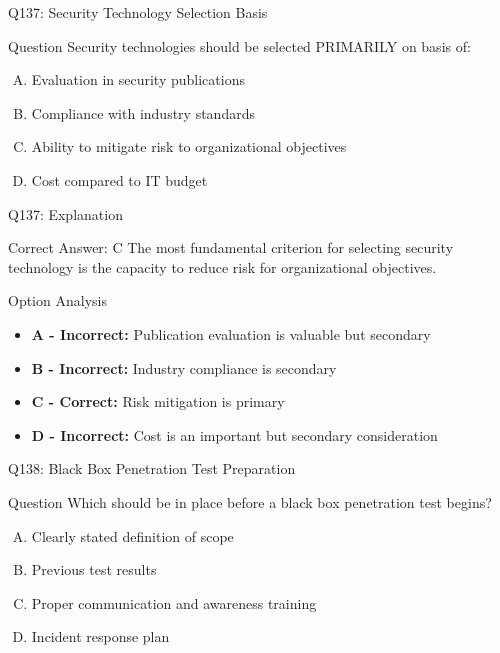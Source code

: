 \documentclass{beamer}
\begin{document}
	\begin{frame}{Q137: Security Technology Selection Basis}
		\begin{block}{Question}
			Security technologies should be selected PRIMARILY on basis of:
		\end{block}
		\begin{enumerate}[(A)]
			\item Evaluation in security publications
			\item Compliance with industry standards
			\item Ability to mitigate risk to organizational objectives
			\item Cost compared to IT budget
		\end{enumerate}
	\end{frame}
	
	\begin{frame}{Q137: Explanation}
		\begin{block}{Correct Answer: C}
			The most fundamental criterion for selecting security technology is the capacity to reduce risk for organizational objectives.
		\end{block}
		\begin{block}{Option Analysis}
			\begin{itemize}
				\item \textbf{A - Incorrect:} Publication evaluation is valuable but secondary
				\item \textbf{B - Incorrect:} Industry compliance is secondary
				\item \textbf{C - Correct:} Risk mitigation is primary
				\item \textbf{D - Incorrect:} Cost is an important but secondary consideration
			\end{itemize}
		\end{block}
	\end{frame}
	
	\begin{frame}{Q138: Black Box Penetration Test Preparation}
		\begin{block}{Question}
			Which should be in place before a black box penetration test begins?
		\end{block}
		\begin{enumerate}[(A)]
			\item Clearly stated definition of scope
			\item Previous test results
			\item Proper communication and awareness training
			\item Incident response plan
		\end{enumerate}
	\end{frame}
	
\end{document}
